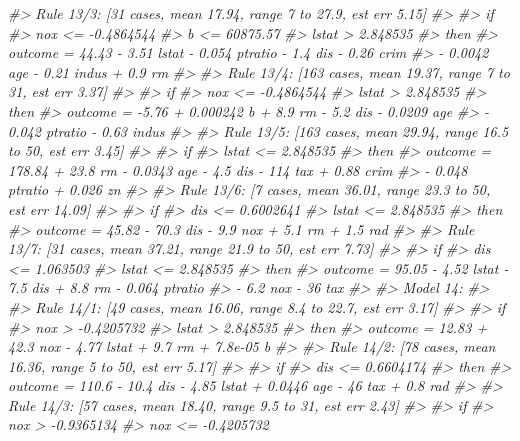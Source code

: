 \documentclass[]{book}
\newenvironment{Shaded}{\begin{snugshade}}{\end{snugshade}}
\newcommand{\CommentTok}[1]{\textcolor[rgb]{0.56,0.35,0.01}{\textit{#1}}}
\begin{document}
\begin{Shaded}
\begin{Highlighting}[]
\CommentTok{#>   Rule 13/3: [31 cases, mean 17.94, range 7 to 27.9, est err 5.15]}
\CommentTok{#> }
\CommentTok{#>     if}
\CommentTok{#>  nox <= -0.4864544}
\CommentTok{#>  b <= 60875.57}
\CommentTok{#>  lstat > 2.848535}
\CommentTok{#>     then}
\CommentTok{#>  outcome = 44.43 - 3.51 lstat - 0.054 ptratio - 1.4 dis - 0.26 crim}
\CommentTok{#>            - 0.0042 age - 0.21 indus + 0.9 rm}
\CommentTok{#> }
\CommentTok{#>   Rule 13/4: [163 cases, mean 19.37, range 7 to 31, est err 3.37]}
\CommentTok{#> }
\CommentTok{#>     if}
\CommentTok{#>  nox <= -0.4864544}
\CommentTok{#>  lstat > 2.848535}
\CommentTok{#>     then}
\CommentTok{#>  outcome = -5.76 + 0.000242 b + 8.9 rm - 5.2 dis - 0.0209 age}
\CommentTok{#>            - 0.042 ptratio - 0.63 indus}
\CommentTok{#> }
\CommentTok{#>   Rule 13/5: [163 cases, mean 29.94, range 16.5 to 50, est err 3.45]}
\CommentTok{#> }
\CommentTok{#>     if}
\CommentTok{#>  lstat <= 2.848535}
\CommentTok{#>     then}
\CommentTok{#>  outcome = 178.84 + 23.8 rm - 0.0343 age - 4.5 dis - 114 tax + 0.88 crim}
\CommentTok{#>            - 0.048 ptratio + 0.026 zn}
\CommentTok{#> }
\CommentTok{#>   Rule 13/6: [7 cases, mean 36.01, range 23.3 to 50, est err 14.09]}
\CommentTok{#> }
\CommentTok{#>     if}
\CommentTok{#>  dis <= 0.6002641}
\CommentTok{#>  lstat <= 2.848535}
\CommentTok{#>     then}
\CommentTok{#>  outcome = 45.82 - 70.3 dis - 9.9 nox + 5.1 rm + 1.5 rad}
\CommentTok{#> }
\CommentTok{#>   Rule 13/7: [31 cases, mean 37.21, range 21.9 to 50, est err 7.73]}
\CommentTok{#> }
\CommentTok{#>     if}
\CommentTok{#>  dis <= 1.063503}
\CommentTok{#>  lstat <= 2.848535}
\CommentTok{#>     then}
\CommentTok{#>  outcome = 95.05 - 4.52 lstat - 7.5 dis + 8.8 rm - 0.064 ptratio}
\CommentTok{#>            - 6.2 nox - 36 tax}
\CommentTok{#> }
\CommentTok{#> Model 14:}
\CommentTok{#> }
\CommentTok{#>   Rule 14/1: [49 cases, mean 16.06, range 8.4 to 22.7, est err 3.17]}
\CommentTok{#> }
\CommentTok{#>     if}
\CommentTok{#>  nox > -0.4205732}
\CommentTok{#>  lstat > 2.848535}
\CommentTok{#>     then}
\CommentTok{#>  outcome = 12.83 + 42.3 nox - 4.77 lstat + 9.7 rm + 7.8e-05 b}
\CommentTok{#> }
\CommentTok{#>   Rule 14/2: [78 cases, mean 16.36, range 5 to 50, est err 5.17]}
\CommentTok{#> }
\CommentTok{#>     if}
\CommentTok{#>  dis <= 0.6604174}
\CommentTok{#>     then}
\CommentTok{#>  outcome = 110.6 - 10.4 dis - 4.85 lstat + 0.0446 age - 46 tax + 0.8 rad}
\CommentTok{#> }
\CommentTok{#>   Rule 14/3: [57 cases, mean 18.40, range 9.5 to 31, est err 2.43]}
\CommentTok{#> }
\CommentTok{#>     if}
\CommentTok{#>  nox > -0.9365134}
\CommentTok{#>  nox <= -0.4205732}

\end{Highlighting}
\end{Shaded}
\end{document}
